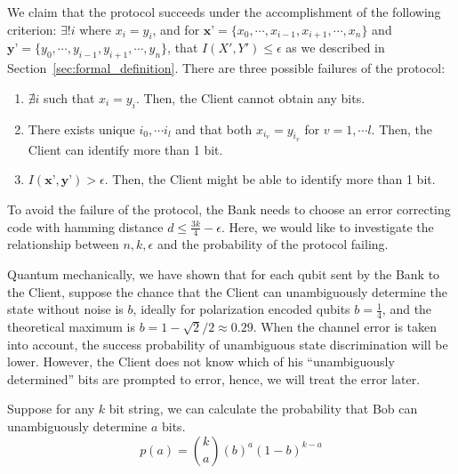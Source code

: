 \documentclass[%
 reprint,
superscriptaddress,
 amsmath,amssymb,
 aps,
]{revtex4-2}
\begin{document}
We claim that the protocol succeeds under the accomplishment of the following criterion: $\exists! i$ where $x_i=y_i$, and for $\textbf{x'}=\{x_0, \cdots, x_{i-1}, x_{i+1}, \cdots, x_n\}$ and $\textbf{y'}=\{y_0, \cdots, y_{i-1}, y_{i+1}, \cdots, y_n\}$, that $I(X', Y')\le \epsilon$ as we described in Section~\ref{sec:formal_definition}. There are three possible failures of the protocol:
\begin{enumerate}
    \item $\nexists i$ such that $x_i=y_i$. Then, the Client cannot obtain any bits.

    \item There exists unique $i_0, \cdots i_l$ and that both $x_{i_v}=y_{i_v}$ for $v=1, \cdots l$. Then, the Client can identify more than 1 bit.

    \item $I(\textbf{x'}, \textbf{y'})>\epsilon$. Then, the Client might be able to identify more than 1 bit.
\end{enumerate}


To avoid the failure of the protocol, the Bank needs to choose an error correcting code with hamming distance $d\le\frac{3k}{4}-\epsilon$. Here, we would like to investigate the relationship between $n, k, \epsilon$ and the probability of the protocol failing.

Quantum mechanically, we have shown that for each qubit sent by the Bank to the Client, suppose the chance that the Client can unambiguously determine the state without noise is $b$, ideally for polarization encoded qubits $b=\frac{1}{4}$, and the theoretical maximum is $b=1-\sqrt{2}/2\approx0.29$. When the channel error is taken into account, the success probability of unambiguous state discrimination will be lower. However, the Client does not know which of his ``unambiguously determined'' bits are prompted to error, hence, we will treat the error later.



Suppose for any $k$ bit string, we can calculate the probability that Bob can unambiguously determine $a$ bits.
\begin{equation}
    p(a) = \binom{k}{a} \left(b\right)^a\left(1-b\right)^{k-a}
\end{equation}
\end{document}
